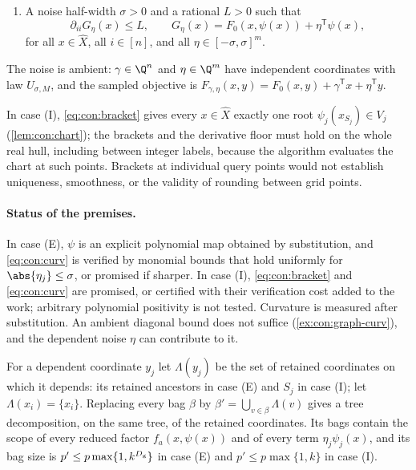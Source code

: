 \begin{definition}
\begin{enumerate}[label=(\roman*)]
$\{y_j\}$ with its parents in case (E) and $S_j\cup\{y_j\}$ in case (I).
\item A noise half-width $\sigma>0$ and a rational $L>0$ such that
\begin{equation}\label{eq:con:curv}
 \partial_{ii}G_\eta(x)\le L,\qquad
 G_\eta(x)=F_0(x,\psi(x))+\eta^{\mathsf T}\psi(x),
\end{equation}
for all $x\in\widehat X$, all $i\in[n]$, and all $\eta\in[-\sigma,\sigma]^m$.
\end{enumerate}
The noise is ambient: $\gamma\in\Q^n$ and $\eta\in\Q^m$ have independent
coordinates with law $U_{\sigma,M}$, and the sampled objective is
$F_{\gamma,\eta}(x,y)=F_0(x,y)+\gamma^{\mathsf T}x+\eta^{\mathsf T}y$.
\end{definition}

In case (I), \eqref{eq:con:bracket} gives every $x\in\widehat X$ exactly one
root $\psi_j(x_{S_j})\in V_j$ (\cref{lem:con:chart}); the brackets and the
derivative floor must hold on the whole real hull, including between
integer labels, because the algorithm evaluates the chart at such points.
Brackets at individual query points would not establish uniqueness,
smoothness, or the validity of rounding between grid points.

\paragraph{Status of the premises.} In case (E), $\psi$ is an explicit
polynomial map obtained by substitution, and \eqref{eq:con:curv} is
verified by monomial bounds that hold uniformly for $\abs{\eta_j}\le\sigma$,
or promised if sharper. In case (I), \eqref{eq:con:bracket} and
\eqref{eq:con:curv} are promised, or certified with their verification cost
added to the work; arbitrary polynomial positivity is not tested.
Curvature is measured after substitution. An ambient diagonal bound does
not suffice (\cref{ex:con:graph-curv}), and the dependent noise $\eta$ can
contribute to it.

\begin{lemma}\label{lem:con:expand}
For a dependent coordinate $y_j$ let $\Lambda(y_j)$ be the set of retained
coordinates on which it depends: its retained ancestors in case (E) and
$S_j$ in case (I); let $\Lambda(x_i)=\{x_i\}$. Replacing every bag $\beta$ by
$\beta'=\bigcup_{v\in\beta}\Lambda(v)$ gives a tree decomposition, on the same
tree, of the retained coordinates. Its bags contain the scope of every
reduced factor $f_a(x,\psi(x))$ and of every term $\eta_j\psi_j(x)$, and its
bag size is $p'\le p\max\{1,k^{D_{\rm g}}\}$ in case (E) and
$p'\le p\max\{1,k\}$ in case (I).
\end{lemma}

